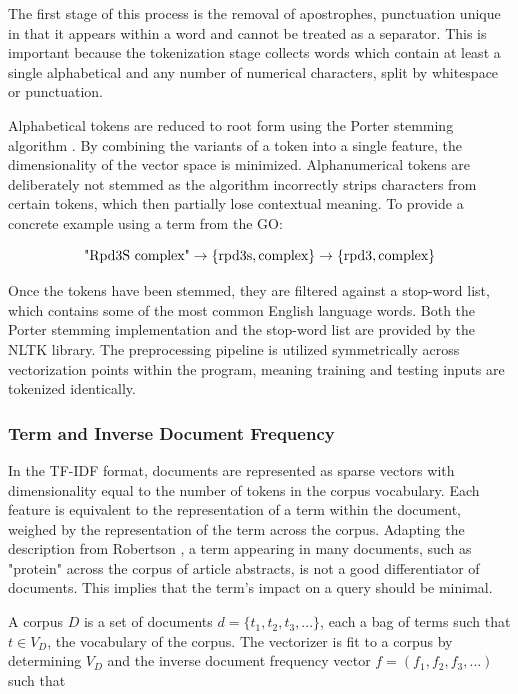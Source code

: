 \documentclass[11pt]{article} %
\theoremstyle{plain}
\theoremstyle{definition}
\begin{document}
The first stage of this process is the removal of apostrophes, punctuation unique in that it appears within a word and cannot be treated as a separator. This is important because the tokenization stage collects words which contain at least a single alphabetical and any number of numerical characters, split by whitespace or punctuation.

Alphabetical tokens are reduced to root form using the Porter stemming algorithm \cite{porter/1980/algorithm}. By combining the variants of a token into a single feature, the dimensionality of the vector space is minimized. Alphanumerical tokens are deliberately not stemmed as the algorithm incorrectly strips characters from certain tokens, which then partially lose contextual meaning. To provide a concrete example using a term from the GO:

\[\textnormal{"Rpd3S complex"} \rightarrow \{\textnormal{rpd3s}, \textnormal{complex}\} \rightarrow  \{\textnormal{rpd3}, \textnormal{complex}\}\]

Once the tokens have been stemmed, they are filtered against a stop-word list, which contains some of the most common English language words. Both the Porter stemming implementation and the stop-word list are provided by the NLTK library. The preprocessing pipeline is utilized symmetrically across vectorization points within the program, meaning training and testing inputs are tokenized identically.

\subsubsection{Term and Inverse Document Frequency}

In the TF-IDF format, documents are represented as sparse vectors with dimensionality equal to the number of tokens in the corpus vocabulary. Each feature is equivalent to the representation of a term within the document, weighed by the representation of the term across the corpus. Adapting the description from Robertson \cite{robertson/2004/understanding}, a term appearing in many documents, such as "protein" across the corpus of article abstracts, is not a good differentiator of documents. This implies that the term's impact on a query should be minimal.

A corpus \(D\) is a set of documents \(d = \{t_1, t_2, t_3,...\}\), each a bag of terms such that \(t \in V_D\), the vocabulary of the corpus. The vectorizer is fit to a corpus by determining \(V_D\) and the inverse document frequency vector \(f = (f_1, f_2, f_3, ...)\) such that
\end{document}
